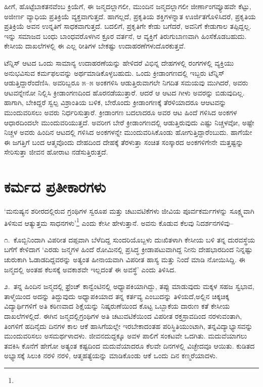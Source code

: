 ಹೀಗೆ, ಹೊಟ್ಟೆಬಾಕತನವೆಂಬ ಕ್ರಿಯೆಗೆ, ಈ ಜನ್ಮದಲ್ಲಾಗಲೀ, ಮುಂದಿನ ಜನ್ಮದಲ್ಲಾಗಲೀ ಜೀರ್ಣಾಂಗವ್ಯೂಹವೇ ಕೆಟ್ಟು, ಅಜೀರ್ಣ ವ್ಯಾಧಿಯ ಪ್ರತಿಕ್ರಿಯೆ ವ್ಯಕ್ತವಾಗುತ್ತದೆ. ಹಾಗಲ್ಲದೆ, ಪ್ರಕೃತಿಯ ಶಕ್ತಿಗಳನ್ನಾತ ಊರ್ಜಿತಗೊಳಿಸಿದರೆ, ಪ್ರಕೃತಿಯ ಪ್ರತಿಕ್ರಿಯೆ ಅವನ ಉನ್ನತಿಗೆ ಸಾಧಕವಾಗುತ್ತದೆ. ಬದಲಿಗೆ, ಪ್ರಕೃತಿಗೇ ಕೇಡು ಬಗೆದರೆ, ಅವನಿಗೆ ಕೇಡುಗಾಲ ತಪ್ಪಿದ್ದಲ್ಲ. ಇನ್ನು ಸಮಾಜದ ಬಂಧು ಬಾಂಧವರೊಳಗಿನ ಕ್ರೂರ ವರ್ತನೆ, ಆ ವ್ಯಕ್ತಿಗೆ ತಿರುಗುಬಾಣವಾಗಿ ಹಿಂಸೆ\break ಕೊಡಬಹುದು. ಕೇಸೀಯ ದಾಖಲೆಗಳಲ್ಲಿ ಈ ಎಲ್ಲ ರೀತಿಗಳ ಬೇಕಷ್ಟು ಉದಾಹರಣೆಗಳು\break ದೊರಕುತ್ತವೆ.

ಟೆನ್ನಿಸ್ ಆಟದ ಒಂದು ಸಾಮಾನ್ಯ ಉದಾಹರಣೆಯನ್ನು ಹೇಳಿದರೆ ವಿಭಿನ್ನ ದೇಹಗಳಲ್ಲಿ ರಂಗಗಳಲ್ಲಿ ವ್ಯಕ್ತಿಯು ಅನುಭವಿಸುವ ಕರ್ಮಫಲವನ್ನು ಅರ್ಥಮಾಡಿಕೊಳ್ಳಬಹುದು. ಒಂದು ಕ್ರೀಡಾಂಗಣದಲ್ಲಿ ಇಬ್ಬರು ಟೆನ್ನಿಸ್ ಆಡುತ್ತಿದ್ದಾರೆಂದೆಣಿಸಿ. ಅವರಿಬ್ಬರೂ ೫–೫ ಅಂಕಗಳಿಸಿ ಆಡುತ್ತಿರುವಾಗಲೇ ನಿಗದಿತ ಸಮಯವು ಮುಗಿದರೆ, ಅವರು ಆಟವನ್ನೇನೋ ನಿಲ್ಲಿಸಿ ಕ್ರೀಡಾಂಗಣದಿಂದ ಹೊರನಡೆಯುತ್ತಾರೆ. ಆದರೆ ಆ ಆಟದ ಗೀಳು ಅವರನ್ನು ಬಿಡುವುದಿಲ್ಲ. ಹಾಗಾಗಿ, ಬೇಕಿದ್ದರೆ ಸ್ವಲ್ಪ ವಿಶ್ರಾಂತಿಯ ಬಳಿಕ, ಬೇರೊಂದು ಕ್ರೀಡಾಂಗಣಕ್ಕೆ ತೆರಳಿಯಾದರೂ ಆ\break ಆಟವನ್ನು ಮುಂದುವರಿಸಲು ಅವರು ನಿರ್ಧರಿಸುತ್ತಾರೆ. ಕ್ರೀಡಾಂಗಣ ಬದಲಾದರೂ ಅವರ ಆಟ ಹಿಂದೆ ಗಳಿಸಿದ ಅಂಕಗಳ ಆಧಾರದಿಂದಲೇ ಮುಂದುವರಿಯುತ್ತದೆ. ಅವರೀಗ ಬೇರೆ ಕ್ರೀಡಾಂಗಣದಲ್ಲಿ ಆಡುತ್ತಿರುವುದು ಎಷ್ಟು ನಿಚ್ಚಳವೋ, ಅಷ್ಟೇ ನಿಚ್ಚಳ ಅವರು ಹಿಂದಿನ ಆಟದಲ್ಲಿ ಗಳಿಸಿದ ಅಂಕಗಳನ್ನೇ ಮುಂದುವರಿಸಿಕೊಂಡು ಹೋಗುತ್ತಿದ್ದಾರೆಂಬುದು. ಹಾಗೆಯೇ ಈ ಜಗತ್ತಿಗೆ ಬಂದ ಆತ್ಮವೊಂದು ದೇಹದಿಂದ ದೇಹಕ್ಕೆ ತೆರಳುತ್ತಾ ಸಂಚಿತ ಸಂಸ್ಕಾರದ ಅಂಕಗಳಿಗೇನೇ ಮತ್ತಷ್ಟನ್ನು ಸೇರಿಸುತ್ತಾ ಜೀವನ ಹೋರಾಟ ನಡೆಸುತ್ತಿರುತ್ತದೆ.


\section*{ಕರ್ಮದ ಪ್ರತೀಕಾರಗಳು}


‘ಮನುಷ್ಯನ ಶರೀರದಲ್ಲಿರುವ ಗ್ರಂಥಿಗಳ ಸ್ವರೂಪ ಮತ್ತು ಚಟುವಟಿಕೆಗಳು ಜೀವಿಯ ಪೂರ್ವಕರ್ಮಗಳನ್ನು ಸೂಕ್ಷ್ಮವಾಗಿ ತಿಳಿಸುವ ಆತ್ಯುತ್ತಮ ಸಾಧನಗಳು’\footnote{} ಎಂದು ಕೇಸೀ ಹೇಳುತ್ತಾನೆ. ಅವನು ಕೊಡುವ ಕೆಲವು ನಿದರ್ಶನಗಳಿವು–

೧.\ ಕೊಬ್ಬಿನಿಂದಾಗಿ ವಿಪರೀತ ದಪ್ಪವಾಗಿ ಬೆಳೆದಿದ್ದ ಸುಂದರಿಯೊಬ್ಬಳು ದುಃಖಿತಳಾಗಿ ಕೇಸೀಯ ಬಳಿ ತನ್ನ ದುರವಸ್ಥೆಯ ಬಗೆಗೆ ಕೇಳಿದಾಗ ‘ಎರಡು ಜನ್ಮಗಳ ಹಿಂದೆ ರೋಮಿನಲ್ಲಿ ಪ್ರಸಿದ್ಧ ಕ್ರೀಡಾಪಟುವಾಗಿದ್ದ ನೀನು ದೇಹಭಾರದಿಂದ ನಿನ್ನಷ್ಟು ಚುರುಕಾಗಿ ಓಡಾಡದಿದ್ದವರನ್ನು ಅತ್ಯಂತ ಹೀನಾಯವಾಗಿ ವಿಪರೀತ ಹಾಸ್ಯ ಮತ್ತು ನಿಂದೆ ಮಾಡಿ ನೋಯಿಸಿದ್ದಿ. ಈ ಜನ್ಮದಲ್ಲಿ ಅಂತಹ ಕೆಲಸಕ್ಕೆ ಅವಕಾಶವೇ ಇಲ್ಲದಂತೆ ಈ ಅವಸ್ಥೆ’ ಎಂದು ತಿಳಿಸಿದ.

೨.\ ತನ್ನ ಹಿಂದಿನ ಜನ್ಮದಲ್ಲಿ ಫ್ರೆಂಚ್ ಕಾನ್ವೆಂಟಿನಲ್ಲಿ ಅಧ್ಯಾಪಕಿಯಾಗಿದ್ದು, ತಪ್ಪು ಮಾಡುವುದು ಮಕ್ಕಳ ಸಹಜ ಸ್ವಭಾವ, ತಾಳ್ಮೆಯಿಂದ ಅದನ್ನು ತಿದ್ದುವುದು ಅಧ್ಯಾಪಕಿಯಾದ ತನ್ನ ಕರ್ತವ್ಯ ಎಂಬುದನ್ನು ತಿಳಿಯದೆ,ಅಲ್ಲಿನ ಚಿಕ್ಕಚಿಕ್ಕ ವಿದ್ಯಾರ್ಥಿಗಳಿಗೆ ಅತಿ ಕಠಿಣವಾದ ಶಿಕ್ಷೆಯನ್ನು ನಿಷ್ಕರುಣೆಯಿಂದ ಕೊಟ್ಟ ಒಬ್ಬಾಕೆಯ ದಾರುಣ ಕತೆ ಕೇಸೀಯ ದಾಖಲೆಗಳಲ್ಲಿದೆ. ಈಗಿನ ಜನ್ಮದಲ್ಲಿ\break ಗ್ರಂಥಿ\-ಗಳ ಅತಿ ಚಟುವಟಿಕೆಯಿಂದ ವಿಪರೀತ ರಕ್ತಸ್ರಾವದಿಂದ ನರಳುವಂತಾಗಿ, ತಿಂಗಳಿಗೆ ಹದಿ\-ನೈದು ದಿನಗಳ ಕಾಲ ಆಕೆ ಹಾಸಿಗೆಯಲ್ಲೇ ಇರಬೇಕಾದಂತಹ ಪರಿಸ್ಥಿತಿಯುಂಟಾಗಿ, ತನ್ನ\break ವಿದ್ಯಾಭ್ಯಾಸವನ್ನು ಮುಂದುವರಿಸಲು ಅಸಮರ್ಥಳಾದಳು. ಜೀವನದುದ್ದಕ್ಕೂ ಅವಳ ಪಾಲಿಗೆ ಸಂಕಟವೇ ಒದಗಿತು. ಮದುವೆಯಾಗಲು ತವಕಿಸಿ ಕೊನೆಗೆ ಹೇಗೋ ಅತ್ಯಂತ ಕಷ್ಟದಿಂದ ಮದುವೆಯಾದರೂ ಕೆಲವೇ ದಿನಗಳಲ್ಲಿ ವಿಚ್ಛೇದವೂ ಆಯಿತು. ಕುಡಿತದ ಅಭ್ಯಾಸಕ್ಕೆ ಸಿಲುಕಿ ನರಳಿ ನರಳಿ, ಆತ್ಮಹತ್ಯೆಯನ್ನು ಮಾಡಿಕೊಂಡು ಆಕೆ ಒಂದು ದಿನ ಕಣ್ಮರೆಯಾದಳು.

